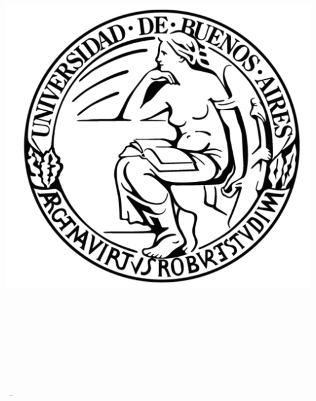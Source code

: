 \begin{titlepage}
    \begin{addmargin}[-1cm]{-3cm}
    \begin{center}
    	
    	\includegraphics[scale=.3]{gfx/uba.jpg}
    	
        \large

        \hfill

        \vfill

        \begingroup
            \color{Maroon}\spacedallcaps{\myTitle} \\ \bigskip
            \color{NavyBlue}\spacedallcaps{\mySubtitle} \\ \bigskip
        \endgroup

        \vfill

		\myUni \\ \bigskip
		\myFaculty \\
        \myDepartment \\ \medskip
        \myDegree \\
        \myDirector

        \myTime\ -- \myVersion

        \vfill

    \end{center}
  \end{addmargin}
\end{titlepage}
